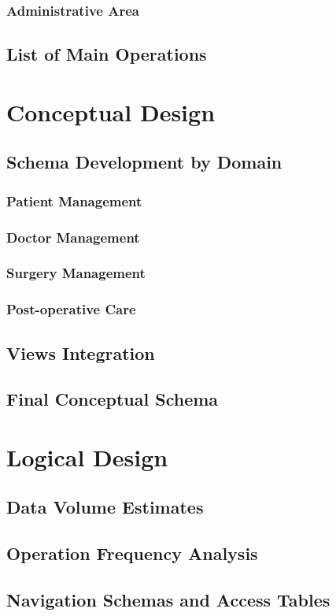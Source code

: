 \documentclass[12pt,a4paper]{report}
\begin{document}
\subsection{Administrative Area}
\section{List of Main Operations}

\chapter{Conceptual Design}
\section{Schema Development by Domain}
\subsection{Patient Management}
\subsection{Doctor Management}
\subsection{Surgery Management}
\subsection{Post-operative Care}
\section{Views Integration}
\section{Final Conceptual Schema}

\chapter{Logical Design}
\section{Data Volume Estimates}
\section{Operation Frequency Analysis}
\section{Navigation Schemas and Access Tables}
\end{document}
